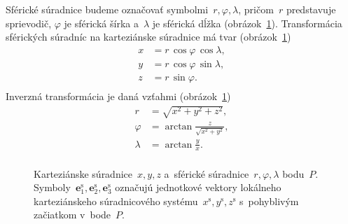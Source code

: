 \documentclass[a4paper, 12pt]{book}
\let\vec\mathbf
\begin{document}
Sférické súradnice budeme označovať symbolmi~$r, \varphi, \lambda$, pričom~$r$ 
predstavuje sprievodič, $\varphi$ je sférická šírka a~$\lambda$ je sférická 
dĺžka (obrázok~\ref{fig:cart_sph}).  Transformácia sférických súradníc na 
karteziánske súradnice má tvar (obrázok~\ref{fig:cart_sph})
%
\begin{equation}
\label{eq:sph2cart}
\begin{split}
x &= r \, \cos\varphi \, \cos\lambda{,}\\
y &= r \, \cos\varphi \, \sin\lambda{,}\\
z &= r \, \sin\varphi{.}\\
\end{split}
\end{equation}
%
Inverzná transformácia je daná vzťahmi (obrázok~\ref{fig:cart_sph})
%
\begin{equation}
\label{eq:cart2sph}
\begin{split}
r &= \sqrt{x^2 + y^2 + z^2}{,}\\
\varphi &= \arctan \frac{z}{\sqrt{x^2 + y^2}}{,}\\
\lambda &= \arctan \frac{y}{x}{.}\\
\end{split}
\end{equation}

\begin{figure}
\centering

\caption{Karteziánske súradnice~$x, y, z$ a~sférické súradnice~$r, \varphi, 
\lambda$ bodu~$P$.  Symboly~$\vec{e}_1^\mathrm{s}, \vec{e}_2^\mathrm{s}, 
\vec{e}_3^\mathrm{s}$ označujú jednotkové vektory lokálneho karteziánskeho 
súradnicového systému~$x^\mathrm{s}, y^\mathrm{s}, z^\mathrm{s}$ s~pohyblivým 
začiatkom v~bode~$P$.}
\label{fig:cart_sph}
\end{figure}
\end{document}
